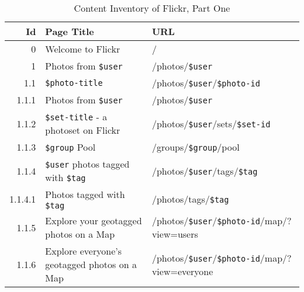 \documentclass[12pt,a4paper]{article}
\newcommand{\var}[1]{\texttt{\${#1}}}
\begin{document}
\begin{table}[h!b!p!]
  \caption{Content Inventory of Flickr, Part One}
  \label{table:flickr.content.inventory.1.1}
  \begin{adjustwidth}{-6em}{-6em}
    \begin{center}
      \begin{small}
        \begin{tabular}{|r|l|l|}

          \hline

          Id &
          Page Title &
          URL \\

          \hline

          0 &
          Welcome to Flickr &
          / \\

          1 &
          Photos from \var{user} &
          /photos/\var{user} \\

            1.1 &
            \var{photo-title} &
            /photos/\var{user}/\var{photo-id} \\

              1.1.1 &
              Photos from \var{user} &
              /photos/\var{user} \\

              1.1.2 &
              \var{set-title} - a photoset on Flickr &
              /photos/\var{user}/sets/\var{set-id} \\

              1.1.3 &
              \var{group} Pool &
              /groups/\var{group}/pool \\

              1.1.4 &
              \var{user} photos tagged with \var{tag} &
              /photos/\var{user}/tags/\var{tag} \\

                1.1.4.1 &
                Photos tagged with \var{tag} &
                /photos/tags/\var{tag} \\

                  1.1.5 &
                  Explore your geotagged photos on a Map &
                  /photos/\var{user}/\var{photo-id}/map/?view=users \\

                  1.1.6 &
                  Explore everyone's geotagged photos on a Map &
                  /photos/\var{user}/\var{photo-id}/map/?view=everyone \\


\end{tabular}
\end{small}
\end{center}
\end{adjustwidth}
\end{table}
\end{document}
